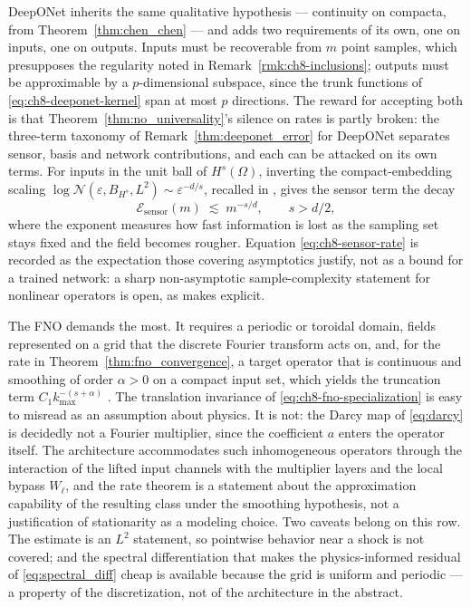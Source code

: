 DeepONet inherits the same qualitative hypothesis --- continuity on compacta, from Theorem~\ref{thm:chen_chen} \cite{chen1995universal} --- and adds two requirements of its own, one on inputs, one on outputs. Inputs must be recoverable from $m$ point samples, which presupposes the regularity noted in Remark~\ref{rmk:ch8-inclusions}; outputs must be approximable by a $p$-dimensional subspace, since the trunk functions of \eqref{eq:ch8-deeponet-kernel} span at most $p$ directions. The reward for accepting both is that Theorem~\ref{thm:no_universality}'s silence on rates is partly broken: the three-term taxonomy of Remark~\ref{thm:deeponet_error} for DeepONet \cite{lanthaler2022error} separates sensor, basis and network contributions, and each can be attacked on its own terms. For inputs in the unit ball of $H^s(\Omega)$, inverting the compact-embedding scaling $\log\mathcal{N}(\varepsilon,B_{H^s},L^2)\sim\varepsilon^{-d/s}$, recalled in , gives the sensor term the decay
\begin{equation}
  \label{eq:ch8-sensor-rate}
  \mathcal{E}_{\mathrm{sensor}}(m) \;\lesssim\; m^{-s/d},
  \qquad s > d/2,
\end{equation}
where the exponent measures how fast information is lost as the sampling set stays fixed and the field becomes rougher. Equation \eqref{eq:ch8-sensor-rate} is recorded as the expectation those covering asymptotics justify, not as a bound for a trained network: a sharp non-asymptotic sample-complexity statement for nonlinear operators is open, as  makes explicit.

The FNO demands the most. It requires a periodic or toroidal domain, fields represented on a grid that the discrete Fourier transform acts on, and, for the rate in Theorem~\ref{thm:fno_convergence}, a target operator that is continuous and smoothing of order $\alpha>0$ on a compact input set, which yields the truncation term $C_1k_{\max}^{-(s+\alpha)}$ \cite{kovachki2021universal}. The translation invariance of \eqref{eq:ch8-fno-specialization} is easy to misread as an assumption about physics. It is not: the Darcy map of \eqref{eq:darcy} is decidedly not a Fourier multiplier, since the coefficient $a$ enters the operator itself. The architecture accommodates such inhomogeneous operators through the interaction of the lifted input channels with the multiplier layers and the local bypass $W_\ell$, and the rate theorem is a statement about the approximation capability of the resulting class under the smoothing hypothesis, not a justification of stationarity as a modeling choice. Two caveats belong on this row. The estimate is an $L^2$ statement, so pointwise behavior near a shock is not covered; and the spectral differentiation that makes the physics-informed residual of \eqref{eq:spectral_diff} cheap is available because the grid is uniform and periodic --- a property of the discretization, not of the architecture in the abstract.

